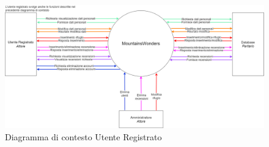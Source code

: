 \documentclass[a4paper,12pt]{article}
\begin{document}
\begin{figure}[H]
   \centering   \includegraphics[width=1.0\textwidth]{img-D2/contesto_registrato.png}
    \caption{Diagramma di contesto Utente Registrato}
\end{figure}
\end{document}
